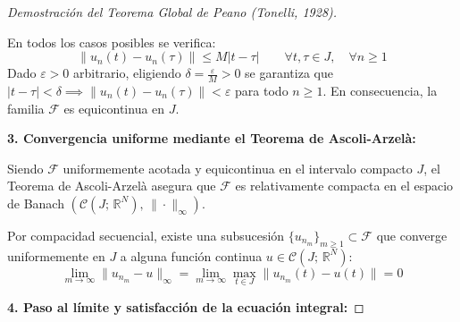 \begin{proof}[Demostración del Teorema Global de Peano (Tonelli, 1928)]
\begin{itemize}
        \begin{center}
        \end{center}
    \end{itemize}

    En todos los casos posibles se verifica:
    \[
        \|u_n(t) - u_n(\tau)\| \leq M |t - \tau| \qquad \forall t, \tau \in J, \quad \forall n \geq 1
    \]
    Dado $\varepsilon > 0$ arbitrario, eligiendo $\delta = \frac{\varepsilon}{M} > 0$ se garantiza que $|t - \tau| < \delta \implies \|u_n(t) - u_n(\tau)\| < \varepsilon$ para todo $n \ge 1$. En consecuencia, la familia $\mathcal{F}$ es equicontinua en $J$.

    \medskip

    \textbf{3. Convergencia uniforme mediante el Teorema de Ascoli-Arzelà:}

    Siendo $\mathcal{F}$ uniformemente acotada y equicontinua en el intervalo compacto $J$, el Teorema de Ascoli-Arzelà asegura que $\mathcal{F}$ es relativamente compacta en el espacio de Banach $(\mathcal{C}(J; \, \mathbb{R}^N), \, \|\cdot\|_\infty)$.

    Por compacidad secuencial, existe una subsucesión $\{u_{n_m}\}_{m \geq 1} \subset \mathcal{F}$ que converge uniformemente en $J$ a alguna función continua $u \in \mathcal{C}(J; \, \mathbb{R}^N)$:
    \[
        \lim_{m \to \infty} \|u_{n_m} - u\|_\infty = \lim_{m \to \infty} \max_{t \in J} \|u_{n_m}(t) - u(t)\| = 0
    \]

    \medskip

    \textbf{4. Paso al límite y satisfacción de la ecuación integral:}


\end{proof}
